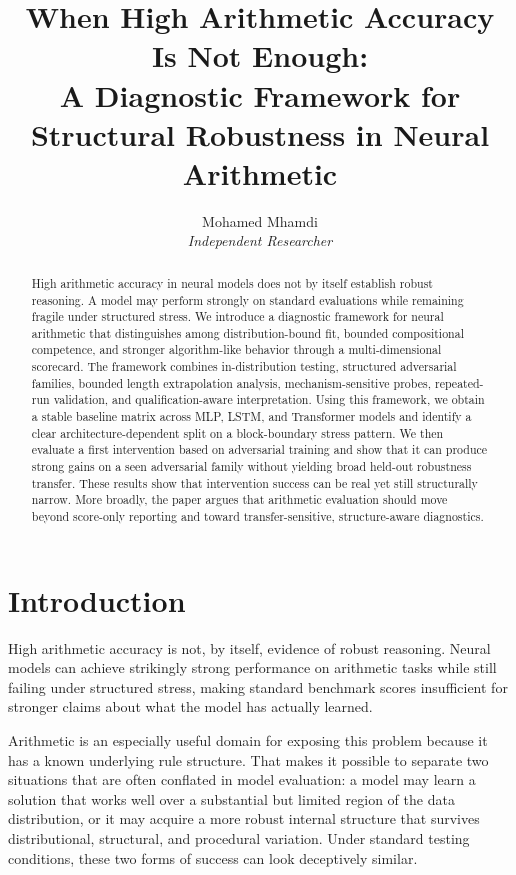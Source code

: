 \documentclass[11pt]{article}
\title{When High Arithmetic Accuracy Is Not Enough:\\
A Diagnostic Framework for Structural Robustness in Neural Arithmetic}
\author{Mohamed Mhamdi \\ \textit{Independent Researcher}}
\date{}
\begin{document}
\maketitle

\begin{abstract}
High arithmetic accuracy in neural models does not by itself establish robust reasoning. A model may perform strongly on standard evaluations while remaining fragile under structured stress. We introduce a diagnostic framework for neural arithmetic that distinguishes among distribution-bound fit, bounded compositional competence, and stronger algorithm-like behavior through a multi-dimensional scorecard. The framework combines in-distribution testing, structured adversarial families, bounded length extrapolation analysis, mechanism-sensitive probes, repeated-run validation, and qualification-aware interpretation. Using this framework, we obtain a stable baseline matrix across MLP, LSTM, and Transformer models and identify a clear architecture-dependent split on a block-boundary stress pattern. We then evaluate a first intervention based on adversarial training and show that it can produce strong gains on a seen adversarial family without yielding broad held-out robustness transfer. These results show that intervention success can be real yet still structurally narrow. More broadly, the paper argues that arithmetic evaluation should move beyond score-only reporting and toward transfer-sensitive, structure-aware diagnostics.
\end{abstract}

\section{Introduction}

High arithmetic accuracy is not, by itself, evidence of robust reasoning. Neural models can achieve strikingly strong performance on arithmetic tasks while still failing under structured stress, making standard benchmark scores insufficient for stronger claims about what the model has actually learned.

Arithmetic is an especially useful domain for exposing this problem because it has a known underlying rule structure. That makes it possible to separate two situations that are often conflated in model evaluation: a model may learn a solution that works well over a substantial but limited region of the data distribution, or it may acquire a more robust internal structure that survives distributional, structural, and procedural variation. Under standard testing conditions, these two forms of success can look deceptively similar.
\end{document}
